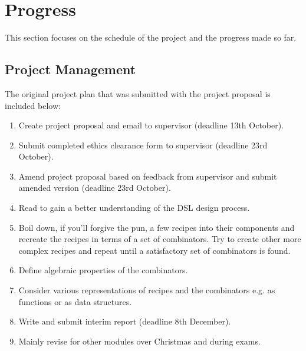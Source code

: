 \documentclass[11pt]{article}
\begin{document}
    \section{Progress}

    This section focuses on the schedule of the project and the progress made so far.
    
    \subsection{Project Management}

    The original project plan that was submitted with the project proposal is included below:

    \begin{enumerate}
        
        \item Create project proposal and email to supervisor
        (deadline 13th October).

        \item Submit completed ethics clearance form to supervisor
        (deadline 23rd October).

        \item Amend project proposal based on feedback from
        supervisor and submit amended version (deadline 23rd October).

        \item Read \cite{hudak, contracts, pretty} to gain a better
        understanding of the DSL design process.

        \item Boil down, if you'll forgive the pun, a few recipes
        into their components and recreate the recipes in terms
        of a set of combinators. Try to create other more complex
        recipes and repeat until a satisfactory set of combinators
        is found.

        \item Define algebraic properties of the combinators.

        \item Consider various representations of recipes and the
        combinators e.g. as functions or as data structures.

        \item Write and submit interim report (deadline 8th December).

        \item Mainly revise for other modules over Christmas and during
        exams.


\end{enumerate}
\end{document}
